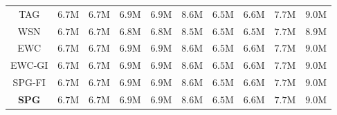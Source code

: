 \begin{table}[ht]
\begin{tabular}{crrrrrrrrr}
TAG &
$6.7$M & $6.7$M & 
$6.9$M & $6.9$M &
$8.6$M & 
$6.5$M & $6.6$M &
$7.7$M & $9.0$M \\

WSN &
$6.7$M & $6.7$M &
$6.8$M & $6.8$M &
$8.5$M & 
$6.5$M & $6.5$M &
$7.7$M & $8.9$M \\

EWC &
$6.7$M & $6.7$M & 
$6.9$M & $6.9$M &
$8.6$M & 
$6.5$M & $6.6$M &
$7.7$M & $9.0$M \\

\hdashline

EWC-GI &
$6.7$M & $6.7$M & 
$6.9$M & $6.9$M &
$8.6$M & 
$6.5$M & $6.6$M &
$7.7$M & $9.0$M \\

SPG-FI &
$6.7$M & $6.7$M & 
$6.9$M & $6.9$M &
$8.6$M & 
$6.5$M & $6.6$M &
$7.7$M & $9.0$M \\

\midrule

\textbf{SPG} &
$6.7$M & $6.7$M & 
$6.9$M & $6.9$M &
$8.6$M & 
$6.5$M & $6.6$M &
$7.7$M & $9.0$M \\

\bottomrule
\end{tabular}
\end{table}
